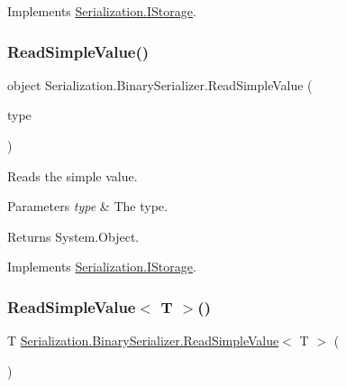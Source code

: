 Implements \hyperlink{interface_serialization_1_1_i_storage_abffb20a2280b9334bef338ccd2d7f5f5}{Serialization.\+I\+Storage}.

\mbox{\label{class_serialization_1_1_binary_serializer_a7b85fa9bbbd8e2b9167abb58e45b2a82}} 
\subsubsection{\texorpdfstring{Read\+Simple\+Value()}{ReadSimpleValue()}}
{\footnotesize\ttfamily object Serialization.\+Binary\+Serializer.\+Read\+Simple\+Value (\begin{DoxyParamCaption}\item[{Type}]{type }\end{DoxyParamCaption})\hspace{0.3cm}{\ttfamily [inline]}}



Reads the simple value. 


\begin{DoxyParams}{Parameters}
{\em type} & The type.\\
\hline
\end{DoxyParams}
\begin{DoxyReturn}{Returns}
System.\+Object.
\end{DoxyReturn}


Implements \hyperlink{interface_serialization_1_1_i_storage_a32b60329697e7f1d128801cc4ac7e614}{Serialization.\+I\+Storage}.

\mbox{\label{class_serialization_1_1_binary_serializer_ad46b4de7951611009e2e85d00ad8178d}} 
\subsubsection{\texorpdfstring{Read\+Simple\+Value$<$ T $>$()}{ReadSimpleValue< T >()}}
{\footnotesize\ttfamily T \hyperlink{class_serialization_1_1_binary_serializer_a7b85fa9bbbd8e2b9167abb58e45b2a82}{Serialization.\+Binary\+Serializer.\+Read\+Simple\+Value}$<$ T $>$ (\begin{DoxyParamCaption}{ }\end{DoxyParamCaption})\hspace{0.3cm}{\ttfamily [inline]}}



